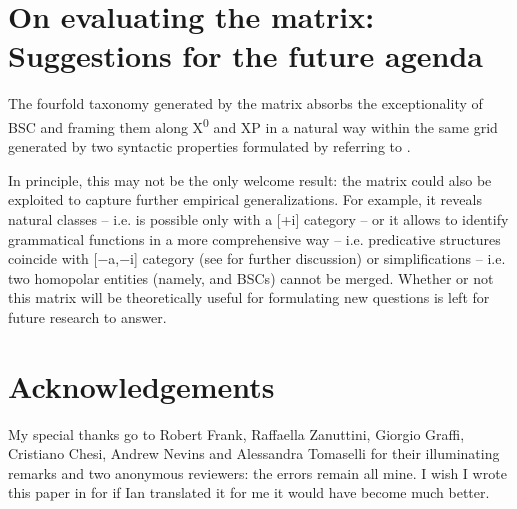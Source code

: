 \documentclass[output=paper]{langsci/langscibook}
\begin{document}
\section{On evaluating the matrix: Suggestions for the future agenda}

The fourfold taxonomy generated by the matrix absorbs the exceptionality of \gls{BSC}
and  framing them along X\textsuperscript{0} and XP in a natural way
within the same grid generated by two syntactic properties formulated by
referring to .

In principle, this may not be the only welcome result: the matrix could also be
exploited to capture further empirical generalizations. For example, it reveals
natural classes – i.e.  is possible only with a [+i] category – or it
allows to identify grammatical functions in a more comprehensive way – i.e.
predicative structures coincide with [−a,−i] category (see
\citealt{Moro2000,Moro2004} for further discussion) or simplifications – i.e.
two homopolar entities (namely,  and \glspl{BSC}) cannot be
merged. Whether or not this matrix will be theoretically useful for formulating
new questions is left for future research to answer.



\printchapterglossary{}

\section*{Acknowledgements}

My special thanks go to Robert Frank, Raffaella Zanuttini, Giorgio Graffi,
Cristiano Chesi, Andrew Nevins and Alessandra Tomaselli for their illuminating
remarks and two anonymous reviewers: the errors remain all mine. I wish I wrote
this paper in  for if Ian translated it for me it would have become much
better.

{\sloppy
\printbibliography[heading=subbibliography,notkeyword=this]
}
\end{document}
